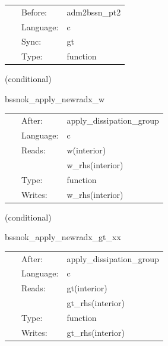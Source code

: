 \hspace{5mm}

 \begin{tabular*}{160mm}{cll} 
~ & Before:  & adm2bssn\_pt2 \\ 
~ & Language:  & c \\ 
~ & Sync:  & gt \\ 
~ & Type:  & function \\ 
\end{tabular*} 


\vspace{5mm}

   (conditional) 

\hspace{5mm} bssnok\_apply\_newradx\_w 



\hspace{5mm}

 \begin{tabular*}{160mm}{cll} 
~ & After:  & apply\_dissipation\_group \\ 
~ & Language:  & c \\ 
~ & Reads:  & w(interior) \\ 
~& ~ &w\_rhs(interior)\\ 
~ & Type:  & function \\ 
~ & Writes:  & w\_rhs(interior) \\ 
\end{tabular*} 


\vspace{5mm}

   (conditional) 

\hspace{5mm} bssnok\_apply\_newradx\_gt\_xx 



\hspace{5mm}

 \begin{tabular*}{160mm}{cll} 
~ & After:  & apply\_dissipation\_group \\ 
~ & Language:  & c \\ 
~ & Reads:  & gt(interior) \\ 
~& ~ &gt\_rhs(interior)\\ 
~ & Type:  & function \\ 
~ & Writes:  & gt\_rhs(interior) \\ 
\end{tabular*} 


